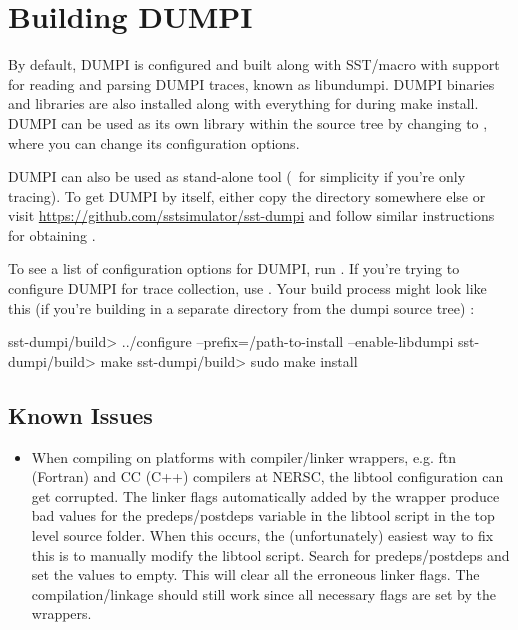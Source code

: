 \section{Building DUMPI}
\label{sec:building:dumpi}

By default, DUMPI is configured and built along with SST/macro with support for reading and parsing DUMPI traces, known as libundumpi.  
DUMPI binaries and libraries are also installed along with everything for \sstmacro during make install.   
DUMPI can be used as its own library within the \sstmacro source tree by changing to , 
where you can change its configuration options.  

DUMPI can also be used as stand-alone tool (\eg~for simplicity if you're only tracing). 
To get DUMPI by itself, either copy the  directory somewhere else or visit \url{https://github.com/sstsimulator/sst-dumpi} and follow similar instructions for obtaining \sstmacro.

To see a list of configuration options for DUMPI, run .  
If you're trying to configure DUMPI for trace collection, use .
Your build process might look like this (if you're building in a separate directory from the dumpi source tree) :

\begin{ShellCmd}
sst-dumpi/build> ../configure --prefix=/path-to-install --enable-libdumpi
sst-dumpi/build> make
sst-dumpi/build> sudo make install
\end{ShellCmd}

\subsection{Known Issues}
\label{subsubsec:building:dumpi:issues}

\begin{itemize}
\item When compiling on platforms with compiler/linker wrappers, e.g. ftn (Fortran) and CC (C++) compilers 
at NERSC, the libtool configuration can get corrupted.  The linker flags automatically added by the 
wrapper produce bad values for the predeps/postdeps variable in the libtool script in the top 
level source folder.  When this occurs, the (unfortunately) easiest way to fix this is to manually modify
the libtool script.  Search for predeps/postdeps and set the values to empty.
This will clear all the erroneous linker flags.  The compilation/linkage should still work since 
all necessary flags are set by the wrappers. 
\end{itemize}


